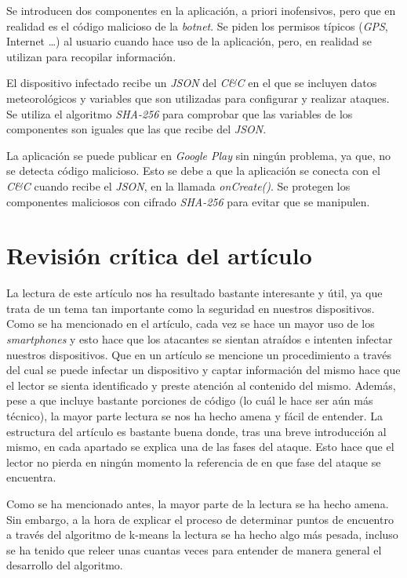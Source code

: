 \documentclass[a4paper,11pt]{report}
\begin{document}
Se introducen dos componentes en la aplicación, a priori inofensivos, pero que en realidad es el código malicioso de la \emph{botnet}. Se piden los permisos típicos (\emph{GPS}, Internet \ldots) al usuario cuando hace uso de la aplicación, pero, en realidad se utilizan para recopilar información.

El dispositivo infectado recibe un \emph{JSON} del \emph{C\&{}C} en el que se incluyen datos meteorológicos y variables que son utilizadas para configurar y realizar ataques. Se utiliza el algoritmo \emph{SHA-256} para comprobar que las variables de los componentes son iguales que las que recibe del \emph{JSON}.

La aplicación se puede publicar en \emph{Google Play} sin ningún problema, ya que, no se detecta código malicioso. Esto se debe a que la aplicación se conecta con el \emph{C\&{}C} cuando recibe el \emph{JSON}, en la llamada \emph{onCreate()}. Se protegen los componentes maliciosos con cifrado \emph{SHA-256} para evitar que se manipulen.



\chapter{Revisión crítica del artículo}

La lectura de este artículo nos ha resultado bastante interesante y útil, ya que trata de un tema tan importante como la seguridad en nuestros dispositivos. Como se ha mencionado en el artículo, cada vez se hace un mayor uso de los \emph{smartphones} y esto hace que los atacantes se sientan atraídos e intenten infectar nuestros dispositivos. Que en un artículo se mencione un procedimiento a través del cual se puede infectar un dispositivo y captar información del mismo hace que el lector se sienta identificado y preste atención al contenido del mismo. Además, pese a que incluye bastante porciones de código (lo cuál le hace ser aún más técnico), la mayor parte lectura se nos ha hecho amena y fácil de entender. La estructura del artículo es bastante buena donde, tras una breve introducción al mismo, en cada apartado se explica una de las fases del ataque. Esto hace que el lector no pierda en ningún momento la referencia de en que fase del ataque se encuentra. 

Como se ha mencionado antes, la mayor parte de la lectura se ha hecho amena. Sin embargo, a la hora de explicar el proceso de determinar puntos de encuentro a través del algoritmo de k-means la lectura se ha hecho algo más pesada, incluso se ha tenido que releer unas cuantas veces para entender de manera general el desarrollo del algoritmo. 
\end{document}
